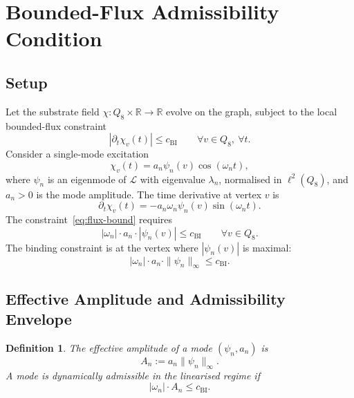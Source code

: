 \documentclass[11pt,a4paper]{article}
\newtheorem{definition}{Definition}
\begin{document}
\section{Bounded-Flux Admissibility Condition}
  \label{sec:bounded-flux-admissibility}

\subsection{Setup}
  \label{subsec:setup}

  Let the substrate field $\chi \colon Q_8 \times \mathbb{R} \to \mathbb{R}$ evolve
  on the graph, subject to the local bounded-flux constraint
  \begin{equation}
    \label{eq:flux-bound}
    |\partial_t \chi_v(t)| \leq c_{\mathrm{BI}}
    \qquad
    \forall v \in Q_8,
    \ \forall t.
  \end{equation}
  Consider a single-mode excitation
  \begin{equation}
    \chi_v(t) = a_n \psi_n(v) \cos(\omega_n t),
  \end{equation}
  where $\psi_n$ is an eigenmode of $\mathcal{L}$ with eigenvalue $\lambda_n$,
  normalised in $\ell^2(Q_8)$, and $a_n > 0$ is the mode amplitude.
  The time derivative at vertex $v$ is
  \begin{equation}
    \partial_t \chi_v(t) = -a_n \omega_n \psi_n(v) \sin(\omega_n t).
  \end{equation}
  The constraint~\eqref{eq:flux-bound} requires
  \begin{equation}
    |\omega_n| \cdot a_n \cdot |\psi_n(v)| \leq c_{\mathrm{BI}}
    \qquad
    \forall v \in Q_8.
  \end{equation}
  The binding constraint is at the vertex where $|\psi_n(v)|$ is maximal:
  \begin{equation}
    |\omega_n| \cdot a_n \cdot \|\psi_n\|_\infty \leq c_{\mathrm{BI}}.
  \end{equation}
\subsection{Effective Amplitude and Admissibility Envelope}
  \label{subsec:effective-amplitude-and-admissibility-envelope}

  \begin{definition}
    The effective amplitude of a mode $(\psi_n, a_n)$ is
    \begin{equation}
      A_n := a_n \|\psi_n\|_\infty.
    \end{equation}
    A mode is dynamically admissible in the linearised regime if
    \begin{equation}
      \label{eq:admissibility}
      |\omega_n| \cdot A_n \leq c_{\mathrm{BI}}.
    \end{equation}
  \end{definition}
\end{document}
